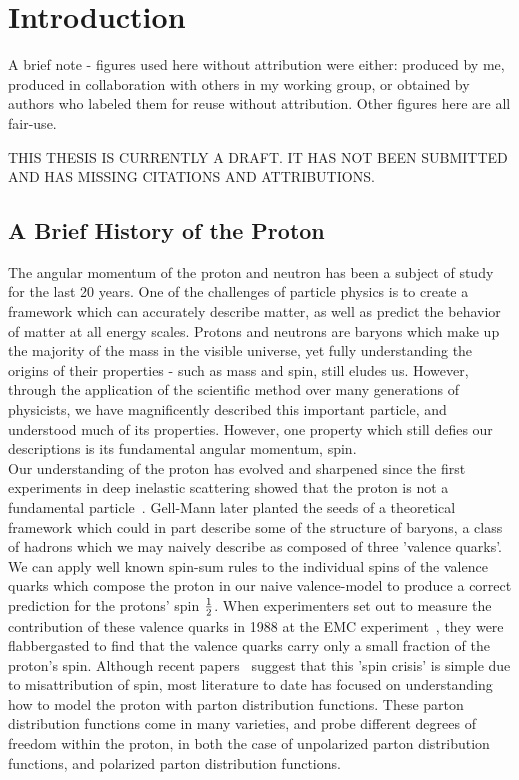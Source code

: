 \chapter{Introduction}

A brief note - figures used here without attribution were either: produced by
me, produced in collaboration with others in my working group, or obtained by
authors who labeled them for reuse without attribution. Other figures here are
all fair-use.

THIS THESIS IS CURRENTLY A DRAFT. IT HAS NOT BEEN SUBMITTED AND HAS MISSING
CITATIONS AND ATTRIBUTIONS. 

\section{A Brief History of the Proton}
The angular momentum of the proton and neutron has been a subject of study for the last 20
years\needcite{}. One of the challenges of particle physics is to create a
framework which can accurately describe matter, as well as predict the behavior
of matter at all energy scales. Protons and neutrons are baryons which make up
the majority of the mass in the visible universe, yet fully understanding the
origins of their properties - such as  mass and spin, still eludes us. However,
through the application of the scientific method over many generations of
physicists, we have magnificently described this important particle, and
understood much of its properties. However, one property which still defies our
descriptions is its fundamental angular momentum, spin. \\
	
Our understanding of the proton has evolved and sharpened since the first
experiments in deep inelastic scattering showed that the proton is not a
fundamental particle~\cite{Breidenbach1969}. Gell-Mann later planted the
seeds of a theoretical framework which could in part describe some of the
structure of baryons, a class of hadrons which we may naively describe as
composed of three 'valence quarks'\needcite{}. We can apply well known spin-sum
rules to the individual spins of the valence quarks which compose the proton in
our naive valence-model to produce a correct prediction for the protons' spin
${1}\over{2}$. When experimenters set out to measure the contribution of these
valence quarks in 1988 at the EMC experiment~\cite{Ashman1988}, they
were flabbergasted to find that the valence quarks carry only a small fraction
of the proton's spin. Although recent papers~\cite{Povh2016} suggest that this 'spin
crisis' is simple due to misattribution of spin, most literature to date has
focused on understanding how to model the proton with parton distribution
functions. These parton distribution functions come in many varieties, and probe
different degrees of freedom within the proton, in both the case of unpolarized
parton distribution functions, and polarized parton distribution functions. \\
 
